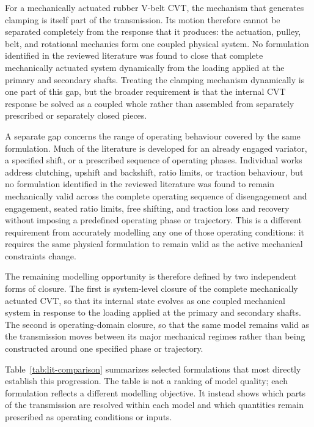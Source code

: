 \documentclass[11pt]{report}
\numberwithin{equation}{section}
\begin{document}
For a mechanically actuated rubber V-belt CVT, the mechanism that generates
clamping is itself part of the transmission. Its motion therefore cannot be
separated completely from the response that it produces: the actuation,
pulley, belt, and rotational mechanics form one coupled physical system. No
formulation identified in the reviewed literature was found to close that
complete mechanically actuated system dynamically from the loading applied at
the primary and secondary shafts. Treating the clamping mechanism dynamically
is one part of this gap, but the broader requirement is that the internal CVT
response be solved as a coupled whole rather than assembled from separately
prescribed or separately closed pieces.

A separate gap concerns the range of operating behaviour covered by the same
formulation. Much of the literature is developed for an already engaged
variator, a specified shift, or a prescribed sequence of operating phases.
Individual works address clutching, upshift and backshift, ratio limits, or
traction behaviour, but no formulation identified in the reviewed literature
was found to remain mechanically valid across the complete operating sequence
of disengagement and engagement, seated ratio limits, free shifting, and
traction loss and recovery without imposing a predefined operating phase or
trajectory. This is a different requirement from accurately modelling any one
of those operating conditions: it requires the same physical formulation to
remain valid as the active mechanical constraints change.

The remaining modelling opportunity is therefore defined by two independent 
forms of closure. The first is system-level closure of the complete mechanically 
actuated CVT, so that its internal state evolves as one coupled mechanical 
system in response to the loading applied at the primary and secondary shafts. 
The second is operating-domain closure, so that the same model remains valid as 
the transmission moves between its major mechanical regimes rather than being 
constructed around one specified phase or trajectory.

Table~\ref{tab:lit-comparison} summarizes selected formulations that most
directly establish this progression. The table is not a ranking of model
quality; each formulation reflects a different modelling objective. It instead
shows which parts of the transmission are resolved within each model and which
quantities remain prescribed as operating conditions or inputs.
\end{document}
